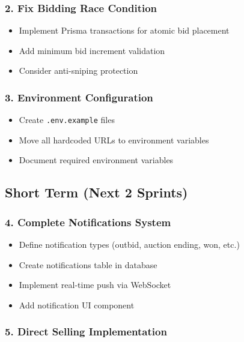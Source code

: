 \documentclass[12pt,a4paper]{article}
\begin{document}
\subsubsection{2. Fix Bidding Race Condition}

\begin{itemize}
    \item Implement Prisma transactions for atomic bid placement
    \item Add minimum bid increment validation
    \item Consider anti-sniping protection
\end{itemize}

\subsubsection{3. Environment Configuration}

\begin{itemize}
    \item Create \texttt{.env.example} files
    \item Move all hardcoded URLs to environment variables
    \item Document required environment variables
\end{itemize}

\subsection{Short Term (Next 2 Sprints)}

\subsubsection{4. Complete Notifications System}

\begin{itemize}
    \item Define notification types (outbid, auction ending, won, etc.)
    \item Create notifications table in database
    \item Implement real-time push via WebSocket
    \item Add notification UI component
\end{itemize}

\subsubsection{5. Direct Selling Implementation}
\end{document}
